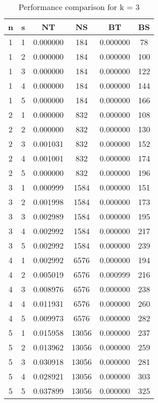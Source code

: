 \documentclass{article}
\begin{document}
    \begin{table}[ht]
    \centering
    \begin{tabular}{|c|c|c|c|c|c|}
    \hline
    n & s & NT & NS & BT & BS \\
    \hline
     1 & 1 & 0.000000 & 184 & 0.000000 & 78 \\ 
 1 & 2 & 0.000000 & 184 & 0.000000 & 100 \\ 
 1 & 3 & 0.000000 & 184 & 0.000000 & 122 \\ 
 1 & 4 & 0.000000 & 184 & 0.000000 & 144 \\ 
 1 & 5 & 0.000000 & 184 & 0.000000 & 166 \\ 
 2 & 1 & 0.000000 & 832 & 0.000000 & 108 \\ 
 2 & 2 & 0.000000 & 832 & 0.000000 & 130 \\ 
 2 & 3 & 0.001031 & 832 & 0.000000 & 152 \\ 
 2 & 4 & 0.001001 & 832 & 0.000000 & 174 \\ 
 2 & 5 & 0.000000 & 832 & 0.000000 & 196 \\ 
 3 & 1 & 0.000999 & 1584 & 0.000000 & 151 \\ 
 3 & 2 & 0.001998 & 1584 & 0.000000 & 173 \\ 
 3 & 3 & 0.002989 & 1584 & 0.000000 & 195 \\ 
 3 & 4 & 0.002992 & 1584 & 0.000000 & 217 \\ 
 3 & 5 & 0.002992 & 1584 & 0.000000 & 239 \\ 
 4 & 1 & 0.002992 & 6576 & 0.000000 & 194 \\ 
 4 & 2 & 0.005019 & 6576 & 0.000999 & 216 \\ 
 4 & 3 & 0.008976 & 6576 & 0.000000 & 238 \\ 
 4 & 4 & 0.011931 & 6576 & 0.000000 & 260 \\ 
 4 & 5 & 0.009973 & 6576 & 0.000000 & 282 \\ 
 5 & 1 & 0.015958 & 13056 & 0.000000 & 237 \\ 
 5 & 2 & 0.013962 & 13056 & 0.000000 & 259 \\ 
 5 & 3 & 0.030918 & 13056 & 0.000000 & 281 \\ 
 5 & 4 & 0.028921 & 13056 & 0.000000 & 303 \\ 
 5 & 5 & 0.037899 & 13056 & 0.000000 & 325 \\ 

    \hline
    \end{tabular}
    \caption{Performance comparison for k = 3}
    \end{table}
    
\end{document}
